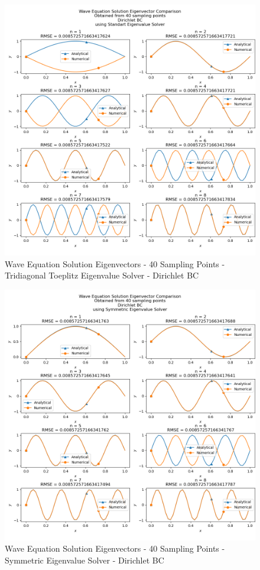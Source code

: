 \documentclass[letterpaper,12pt]{article}
\begin{document}
\begin{figure}[H]
\centerline{\includegraphics[width=\linewidth]{figures/2_40_Standart_Eigenvalue_Solver_d_eigenvector.png}}
\caption{Wave Equation Solution Eigenvectors - 40 Sampling Points - Tridiagonal Toeplitz Eigenvalue Solver - Dirichlet BC}
\label{fig:2_40_Standart_Eigenvalue_Solver_d_eigenvector}
\end{figure}

\begin{figure}[H]
\centerline{\includegraphics[width=\linewidth]{figures/2_40_Symmetric_Eigenvalue_Solver_d_eigenvector.png}}
\caption{Wave Equation Solution Eigenvectors - 40 Sampling Points - Symmetric Eigenvalue Solver - Dirichlet BC}
\label{fig:2_40_Symmetric_Eigenvalue_Solver_d_eigenvector}
\end{figure}
\end{document}
